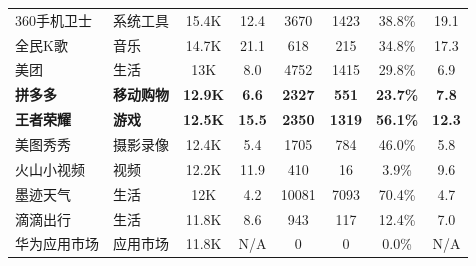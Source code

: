 \begin{ThreePartTable}
\begin{longtable}{l l c c c c c c}
        \rowcolor{gray!15} 360手机卫士               & 系统工具       & 15.4K                      & 12.4                       & 3670           & 1423                       & 38.8\%       & 19.1                       \\
        全民K歌                                      & 音乐           & 14.7K                      & 21.1                       & 618            & 215                        & 34.8\%       & 17.3                       \\
        \rowcolor{gray!15} 美团                      & 生活           & 13K                        & 8.0                        & 4752           & 1415                       & 29.8\%       & 6.9                        \\
        {\bf 拼多多}\tnote{*}                        & {\bf 移动购物} & {\bf 12.9K}                & {\bf 6.6}                  & {\bf 2327}     & {\bf 551}                  & {\bf 23.7\%} & {\bf 7.8}                  \\
        \rowcolor{gray!15} {\bf 王者荣耀}\tnote{*}   & {\bf 游戏}     & {\bf 12.5K}                & {\bf 15.5}                 & {\bf 2350}     & {\bf 1319}                 & {\bf 56.1\%} & {\bf 12.3}                 \\
        美图秀秀                                     & 摄影录像       & 12.4K                      & 5.4                        & 1705           & 784                        & 46.0\%       & 5.8                        \\
        \rowcolor{gray!15} 火山小视频                & 视频           & 12.2K                      & 11.9                       & 410            & 16                         & 3.9\%        & 9.6                        \\
        墨迹天气                                     & 生活           & 12K                        & 4.2                        & 10081          & 7093                       & 70.4\%       & 4.7                        \\
        \rowcolor{gray!15} 滴滴出行                  & 生活           & 11.8K                      & 8.6                        & 943            & 117                        & 12.4\%       & 7.0                        \\
        华为应用市场                                 & 应用市场       & 11.8K                      & N/A                        & 0              & 0                          & 0.0\%        & N/A                        \\

\end{longtable}
\end{ThreePartTable}

